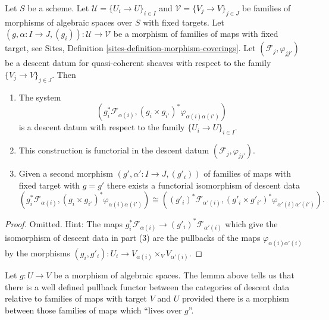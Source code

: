 \begin{lemma}
\label{lemma-map-families}
Let $S$ be a scheme.
Let $\mathcal{U} = \{U_i \to U\}_{i \in I}$ and
$\mathcal{V} = \{V_j \to V\}_{j \in J}$
be families of morphisms of algebraic spaces over $S$ with fixed targets.
Let $(g, \alpha : I \to J, (g_i)) : \mathcal{U} \to \mathcal{V}$
be a morphism of families of maps with fixed target, see
Sites, Definition \ref{sites-definition-morphism-coverings}.
Let $(\mathcal{F}_j, \varphi_{jj'})$ be a descent
datum for quasi-coherent sheaves with respect to the
family $\{V_j \to V\}_{j \in J}$. Then
\begin{enumerate}
\item The system
$$
\left(g_i^*\mathcal{F}_{\alpha(i)},
(g_i \times g_{i'})^*\varphi_{\alpha(i)\alpha(i')}\right)
$$
is a descent datum with respect to the family $\{U_i \to U\}_{i \in I}$.
\item This construction is functorial in the descent datum
$(\mathcal{F}_j, \varphi_{jj'})$.
\item Given a second morphism
$(g', \alpha' : I \to J, (g'_i))$
of families of maps with fixed target
with $g = g'$ there exists a functorial isomorphism of descent data
$$
(g_i^*\mathcal{F}_{\alpha(i)},
(g_i \times g_{i'})^*\varphi_{\alpha(i)\alpha(i')})
\cong
((g'_i)^*\mathcal{F}_{\alpha'(i)},
(g'_i \times g'_{i'})^*\varphi_{\alpha'(i)\alpha'(i')}).
$$
\end{enumerate}
\end{lemma}

\begin{proof}
Omitted. Hint: The maps
$g_i^*\mathcal{F}_{\alpha(i)} \to (g'_i)^*\mathcal{F}_{\alpha'(i)}$
which give the isomorphism of descent data in part (3)
are the pullbacks of the maps $\varphi_{\alpha(i)\alpha'(i)}$ by the
morphisms $(g_i, g'_i) : U_i \to V_{\alpha(i)} \times_V V_{\alpha'(i)}$.
\end{proof}

\noindent
Let $g : U \to V$ be a morphism of algebraic spaces.
The lemma above tells us that there is a well defined pullback functor
between the categories of descent data relative to families of
maps with target $V$ and $U$ provided there is a morphism between those
families of maps which ``lives over $g$''.

